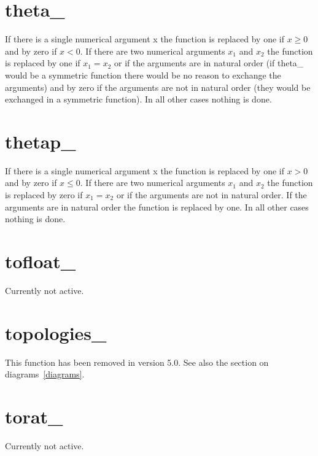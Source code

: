 
\section{theta\_}
\label{funtheta}
\noindent If there is a single numerical argument x the function is 
replaced by one if $x \ge 0$ and by zero if $x < 0$. If there are two 
numerical arguments $x_1$ and $x_2$ the function is replaced by one if $x_1 
= x_2$ or if the arguments are in natural order (if theta\_ would be a 
symmetric function there would be no reason to exchange the arguments) and 
by zero if the arguments are not in natural order (they would be exchanged 
in a symmetric function). In all other cases nothing is done.


\section{thetap\_}
\label{funthetap}
\noindent If there is a single numerical argument x the function is 
replaced by one if $x > 0$ and by zero if $x \le 0$. If there are two 
numerical arguments $x_1$ and $x_2$ the function is replaced by zero if $x_1 
= x_2$ or if the arguments are not in natural order. If the arguments are 
in natural order the function is replaced by one. In all other cases 
nothing is done.


\section{tofloat\_}
\label{funtofloat}
\noindent Currently not active.


\section{topologies\_}
\label{funtopologies}
\noindent This function has been removed in version 5.0.
See also the section on diagrams~\ref{diagrams}.


\section{torat\_}
\label{funtorat}
\noindent Currently not active.

